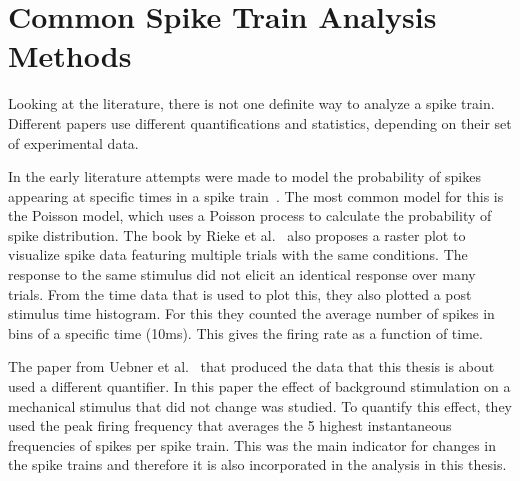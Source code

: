\section{Common Spike Train Analysis Methods}
Looking at the literature, there is not one definite way to analyze a spike train. Different papers use different quantifications and statistics, depending on their set of experimental data.

In the early literature attempts were made to model the probability of spikes appearing at specific times in a spike train~\cite{spikeGeneral}. The most common model for this is the Poisson model, which uses a Poisson process to calculate the probability of spike distribution.
The book by Rieke et al.~\cite{rieke1999spikes} also proposes a raster plot to visualize spike data featuring multiple trials with the same conditions. The response to the same stimulus did not elicit an identical response over many trials. From the time data that is used to plot this, they also plotted a post stimulus time histogram. For this they counted the average number of spikes in bins of a specific time (10ms). This gives the firing rate as a function of time.

The paper from Uebner et al.~\cite{roberto} that produced the data that this thesis is about used a different quantifier. In this paper the effect of background stimulation on a mechanical stimulus that did not change was studied. To quantify this effect, they used the peak firing frequency that averages the 5 highest instantaneous frequencies of spikes per spike train. This was the main indicator for changes in the spike trains and therefore it is also incorporated in the analysis in this thesis.


